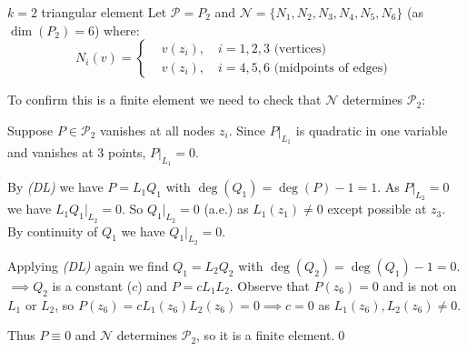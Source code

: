 \begin{example}{$k=2$ triangular element}{}
    Let $\mathcal{P} = P_2$ and $\mathcal{N} = \{N_1, N_2, N_3, N_4, N_5, N_6\}$ (as $\dim(P_2) = 6$) where:
    \[
        N_i(v) =
        \begin{cases}
             & v(z_i), \quad i = 1, 2, 3 \text{ (vertices) } \\
             & v(z_i), \quad i = 4, 5, 6 \text{ (midpoints of edges) }
        \end{cases}
    \]
    \begin{center}
    \end{center}
    To confirm this is a finite element we need to check that $\mathcal{N}$ determines $\mathcal{P}_2$:

    Suppose $P \in \mathcal{P}_2$ vanishes at all nodes $z_i$. Since $P|_{L_1}$ is quadratic in one variable and vanishes at $3$ points, $P|_{L_1} = 0$.

    By \emph{(DL)} we have $P = L_1 Q_1$ with $\deg(Q_1) = \deg(P) - 1 = 1$.
    As $P|_{L_2} = 0$ we have $L_1Q_1|_{L_2} = 0$. So $Q_1|_{L_2} = 0$ (a.e.) as $L_1(z_1) \neq 0$ except possible at $z_3$.
    By continuity of $Q_1$ we have $Q_1|_{L_2} = 0$.

    Applying \emph{(DL)} again we find $Q_1 = L_2 Q_2$ with $\deg(Q_2) = \deg(Q_1) - 1 = 0$.
    $\implies Q_2$ is a constant ($c$) and $P = c L_1 L_2$. Observe that $P(z_6) = 0$ and is not on $L_1$ or $L_2$, so $P(z_6) = c L_1(z_6) L_2(z_6) = 0 \implies c = 0$ as $L_1(z_6), L_2(z_6) \neq 0$.

    Thus $P \equiv 0$ and $\mathcal{N}$ determines $\mathcal{P}_2$, so it is a finite element.\qed

\end{example}
